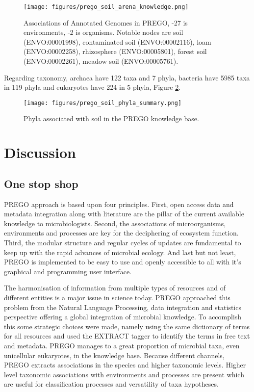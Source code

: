    \begin{figure}[hbt!]
      \centering
      \texttt{[image: figures/prego\_soil\_arena\_knowledge.png]}
      \caption[PREGO soil network of associations of annotated genomes]{
         Associations of Annotated Genomes in PREGO, -27 is environments, -2 is organisms. Notable nodes are soil (ENVO:00001998), contaminated soil (ENVO:00002116), loam (ENVO:00002258), rhizosphere (ENVO:00005801), forest soil (ENVO:00002261), meadow soil (ENVO:00005761).}
      \label{fig:prego-soil-network_k}
   \end{figure}

Regarding taxonomy, archaea have 122 taxa and 7 phyla, bacteria have 5985 taxa
in 119 phyla and eukaryotes have 224 in 5 phyla, Figure \ref{fig:prego-soil-phyla}.

   \begin{figure}[hbt!]
      \centering
      \texttt{[image: figures/prego\_soil\_phyla\_summary.png]}
      \caption[PREGO soil taxonomy summary]{
         Phyla associated with soil in the PREGO knowledge base.}
      \label{fig:prego-soil-phyla}
   \end{figure}


\section{Discussion}
\label{sec:prego-discussion}

   \subsection{One stop shop}
   \label{subsec:prego-contents-disc}

PREGO approach is based upon four principles. First, open access data and
metadata integration along with literature are the pillar of the current
available knowledge to microbiologists. Second, the associations of microorganisms,
environments and processes are key for the deciphering of ecosystem function.
Third, the modular structure and regular cycles of updates are fundamental to
keep up with the rapid advances of microbial ecology. And last but not least,
PREGO is implemented to be easy to use and openly accessible to all with it’s graphical and programming user interface.

The harmonisation of information from multiple types of resources and of different
entities is a major issue in science today. PREGO approached this problem from 
the Natural Language Processing, data integration and statistics perspective offering a global integration 
of microbial knowledge. To accomplish this some strategic choices were made, 
namely using the same dictionary of terms for all resources and used 
the EXTRACT tagger to identify the terms in free text and metadata.
PREGO manages to a great proportion of microbial taxa, even unicellular eukaryotes, in the knowledge base.
Because different channels, PREGO extracts associations in the species and higher taxonomic levels.
Higher level taxonomic associations with environments and processes are present
which are useful for classification processes and versatility of taxa hypotheses.

